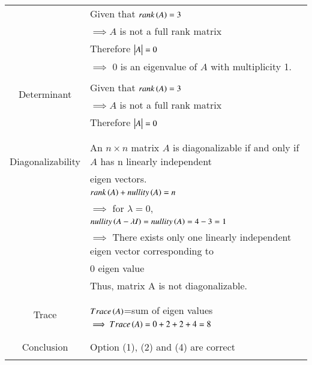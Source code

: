 \documentclass[journal,12pt]{IEEEtran}
\begin{document}
\begin{longtable}{|c|l|}
	& Given that $rank\left(A\right)=3$\\
	& $\implies A$ is not a full rank matrix\\
	& Therefore $\begin{vmatrix}A\end{vmatrix}=0$\\
	& $\implies$ 0 is an eigenvalue of $A$ with multiplicity 1.\\
	\hline
	\multirow{3}{*}{Determinant} & \\
	& Given that $rank\left(A\right)=3$\\
	& $\implies A$ is not a full rank matrix\\
	& Therefore $\begin{vmatrix}A\end{vmatrix}=0$\\
	&\\
	\hline
    \multirow{3}{*}{Diagonalizability} 
    & \\
    & An $n\times n$ matrix $A$ is diagonalizable if and only if $A$ has n linearly independent \\& eigen vectors.\\
	& $rank\left(A\right)+nullity\left(A\right)=n$\\
	& $\implies$ for $\lambda=0$,\\
	& $nullity\left(A-\lambda I\right)=nullity\left(A\right)=4-3=1$\\
	& $\implies$ There exists only one linearly independent eigen vector corresponding to \\& $0$ eigen value\\
	& Thus, matrix A is not diagonalizable.\\
	&\\
    \hline
    \multirow{3}{*}{Trace} & \\
	& $Trace\left(A\right)$=sum of eigen values\\
	& $\implies Trace\left(A\right)=0+2+2+4=8$\\
	&\\
	\hline
	\multirow{3}{*}{Conclusion} & \\
	& Option (1), (2) and (4) are correct\\
	&\\
	\hline
\end{longtable}
\end{document}

